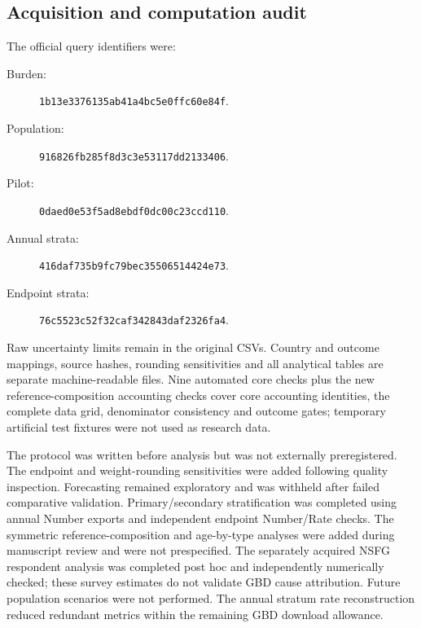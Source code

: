 \documentclass[11pt,a4paper]{article}
\begin{document}
\subsection{Acquisition and computation audit}
The official query identifiers were:
\begin{description}
\item[Burden:] \texttt{1b13e3376135ab41a4bc5e0ffc60e84f}.
\item[Population:] \texttt{916826fb285f8d3c3e53117dd2133406}.
\item[Pilot:] \texttt{0daed0e53f5ad8ebdf0dc00c23ccd110}.
\item[Annual strata:] \texttt{416daf735b9fc79bec35506514424e73}.
\item[Endpoint strata:] \texttt{76c5523c52f32caf342843daf2326fa4}.
\end{description}
Raw uncertainty limits remain in the original CSVs. Country and outcome mappings, source hashes, rounding sensitivities and all analytical tables are separate machine-readable files. Nine automated core checks plus the new reference-composition accounting checks cover core accounting identities, the complete data grid, denominator consistency and outcome gates; temporary artificial test fixtures were not used as research data.

The protocol was written before analysis but was not externally preregistered. The endpoint and weight-rounding sensitivities were added following quality inspection. Forecasting remained exploratory and was withheld after failed comparative validation. Primary/secondary stratification was completed using annual Number exports and independent endpoint Number/Rate checks. The symmetric reference-composition and age-by-type analyses were added during manuscript review and were not prespecified. The separately acquired NSFG respondent analysis was completed post hoc and independently numerically checked; these survey estimates do not validate GBD cause attribution. Future population scenarios were not performed. The annual stratum rate reconstruction reduced redundant metrics within the remaining GBD download allowance.
\end{document}
